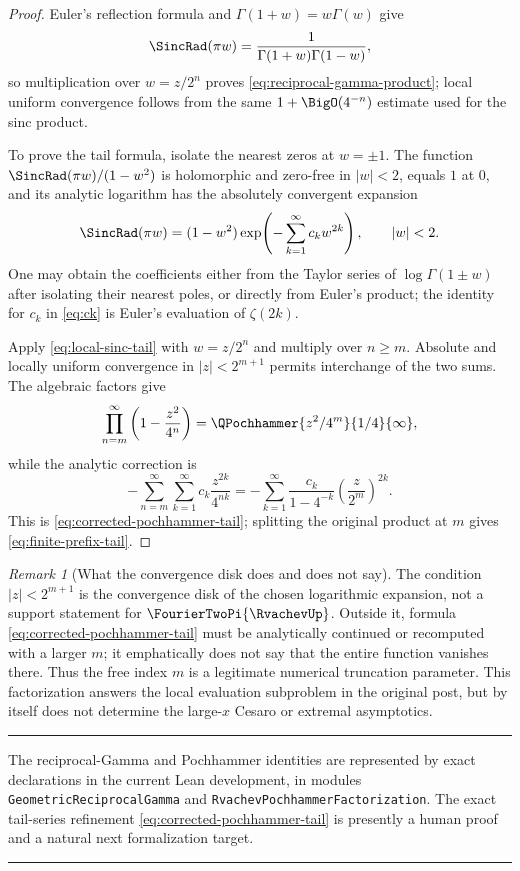 \documentclass[11pt,oneside]{article}
\numberwithin{equation}{section}
\theoremstyle{definition}
\theoremstyle{remark}
\newtheorem{remark}[theorem]{Remark}
\newcommand{\lean}[1]{\texttt{#1}}
\newenvironment{boxedremark}{%
  \par\smallskip\noindent\begin{center}\begin{minipage}{0.94\textwidth}%
  \color{black}\hrule\vspace{0.6em}\small
}{%
  \vspace{0.6em}\hrule\end{minipage}\end{center}\smallskip
}
\begin{document}
\begin{proof}
Euler's reflection formula and $\Gamma(1+w)=w\Gamma(w)$ give
\[
 \SincRad(\pi w)=\frac{1}{\Gamma(1+w)\Gamma(1-w)},
\]
so multiplication over $w=z/2^n$ proves
\eqref{eq:reciprocal-gamma-product}; local uniform convergence follows from the same
$1+\BigO(4^{-n})$ estimate used for the sinc product.

To prove the tail formula, isolate the nearest zeros at $w=\pm1$.  The function
$\SincRad(\pi w)/(1-w^2)$ is holomorphic and zero-free in $|w|<2$, equals $1$ at $0$, and its
analytic logarithm has the absolutely convergent expansion
\begin{equation}
 \SincRad(\pi w)
 =(1-w^2)\exp\!\left(-\sum_{k=1}^{\infty}c_kw^{2k}\right),
 \qquad |w|<2.
 \label{eq:local-sinc-tail}
\end{equation}
One may obtain the coefficients either from the Taylor series of $\log\Gamma(1\pm w)$
after isolating their nearest poles, or directly from Euler's product; the identity for
$c_k$ in \eqref{eq:ck} is Euler's evaluation of $\zeta(2k)$.

Apply \eqref{eq:local-sinc-tail} with $w=z/2^n$ and multiply over $n\ge m$.  Absolute and
locally uniform convergence in $|z|<2^{m+1}$ permits interchange of the two sums.  The
algebraic factors give
\[
 \prod_{n=m}^{\infty}\left(1-\frac{z^2}{4^n}\right)
 =\QPochhammer{z^2/4^m}{1/4}{\infty},
\]
while the analytic correction is
\[
 -\sum_{n=m}^{\infty}\sum_{k=1}^{\infty}c_k\frac{z^{2k}}{4^{nk}}
 =-\sum_{k=1}^{\infty}
   \frac{c_k}{1-4^{-k}}\left(\frac{z}{2^m}\right)^{2k}.
\]
This is \eqref{eq:corrected-pochhammer-tail}; splitting the original product at $m$ gives
\eqref{eq:finite-prefix-tail}.
\end{proof}

\begin{remark}[What the convergence disk does and does not say]
The condition $|z|<2^{m+1}$ is the convergence disk of the chosen logarithmic expansion,
not a support statement for $\FourierTwoPi{\RvachevUp}$.  Outside it, formula
\eqref{eq:corrected-pochhammer-tail} must be analytically continued or recomputed with a
larger $m$; it emphatically does not say that the entire function vanishes there.  Thus the
free index $m$ is a legitimate numerical truncation parameter.  This factorization answers
the local evaluation subproblem in the original post, but by itself does not determine the
large-$x$ Cesaro or extremal asymptotics.
\end{remark}

\begin{boxedremark}
The reciprocal-Gamma and Pochhammer identities are represented by exact declarations in the current Lean
development, in modules \lean{GeometricReciprocalGamma} and
\lean{RvachevPochhammerFactorization}.  The exact tail-series refinement
\eqref{eq:corrected-pochhammer-tail} is presently a human proof and a natural next
formalization target.
\end{boxedremark}
\end{document}
